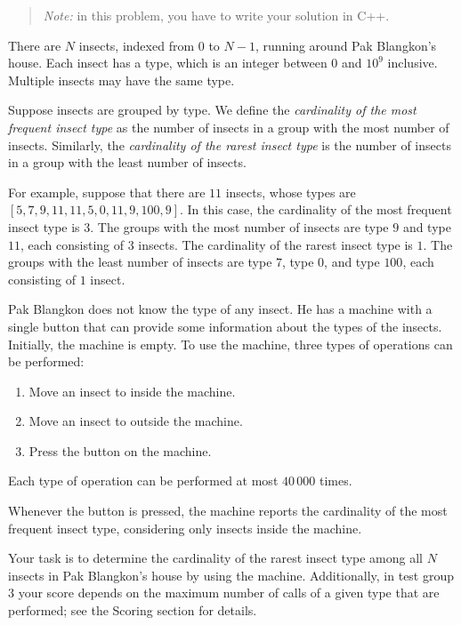 
\begin{quote}
\textit{Note:} in this problem, you have to write your solution in C++.
\end{quote}

There are $N$ insects, indexed from $0$ to $N-1$, running around Pak Blangkon's house. Each insect has
a type, which is an integer between $0$ and $10^9$ inclusive. Multiple insects may have the same type.

Suppose insects are grouped by type. We define the \emph{cardinality of the most frequent insect type}
as the number of insects in a group with the most number of insects. Similarly, the \emph{cardinality
of the rarest insect type} is the number of insects in a group with the least number of insects.

For example, suppose that there are $11$ insects, whose types are $[5, 7, 9, 11, 11, 5, 0, 11, 9, 100,
9]$. In this case, the cardinality of the most frequent insect type is $3$. The groups with the most
number of insects are type $9$ and type $11$, each consisting of $3$ insects. The cardinality of the
rarest insect type is $1$. The groups with the least number of insects are type $7$, type $0$, and type
$100$, each consisting of $1$ insect.

Pak Blangkon does not know the type of any insect. He has a machine with a single button that can
provide some information about the types of the insects. Initially, the machine is empty. To use the
machine, three types of operations can be performed:
\begin{enumerate}
  \item Move an insect to inside the machine.
  \item Move an insect to outside the machine.
  \item Press the button on the machine.
\end{enumerate}

Each type of operation can be performed at most $40\,000$ times.

Whenever the button is pressed, the machine reports the cardinality of the most frequent insect type,
considering only insects inside the machine.

Your task is to determine the cardinality of the rarest insect type among all $N$ insects in Pak
Blangkon's house by using the machine. Additionally, in test group $3$ your score depends on the
maximum number of calls of a given type that are performed; see the Scoring section for details.

